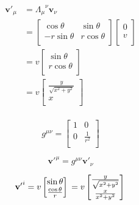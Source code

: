 \documentclass[12pt]{article}
\begin{document}
\begin{equation*}
      \begin{split}
            {\mathbf{v}'}_\mu
             & =
            {\Lambda_\mu}^\nu \mathbf{v}_\nu \\
             & =
            \begin{bmatrix}
                  \cos{\theta}     & \sin{\theta}   \\
                  - r \sin{\theta} & r \cos{\theta} \\
            \end{bmatrix}
            \begin{bmatrix}
                  0 \\
                  v \\
            \end{bmatrix}                   \\
             & = v
            \begin{bmatrix}
                  \sin{\theta}   \\
                  r \cos{\theta} \\
            \end{bmatrix}                   \\
             & = v
            \begin{bmatrix}
                  \frac{y}{\sqrt{x^2+y^2}} \\
                  x                        \\
            \end{bmatrix} \\
      \end{split}
\end{equation*}

\[
      g^{\mu \nu} =
      \begin{bmatrix}
            1 & 0             \\
            0 & \frac{1}{r^2} \\
      \end{bmatrix}
\]

\[
      {\mathbf{v}'}^\mu = g^{\mu\nu} {\mathbf{v}'}_\nu
\]

\[
      {\mathbf{v}'}^i
      = v
      \begin{bmatrix}
            \sin{\theta}           \\
            \frac{\cos{\theta}}{r} \\
      \end{bmatrix}                   \\
      = v
      \begin{bmatrix}
            \frac{y}{\sqrt{x^2+y^2}} \\
            \frac{x}{x^2+y^2}        \\
      \end{bmatrix} \\
\]
\end{document}
